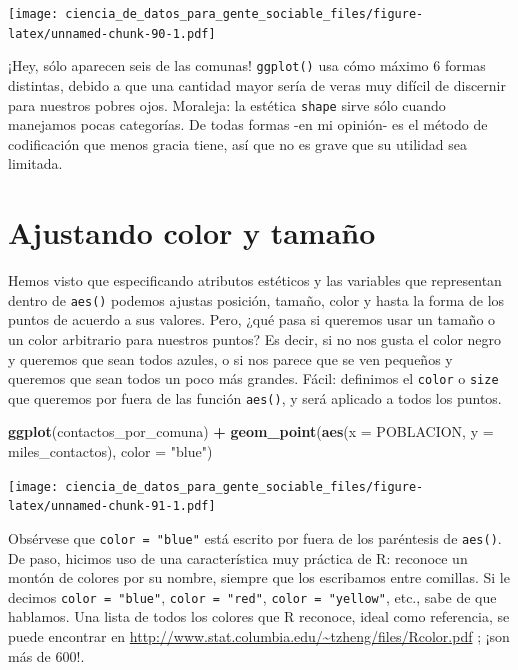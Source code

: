 \documentclass[spanish,]{book}
\newenvironment{Shaded}{\begin{snugshade}}{\end{snugshade}}
\newcommand{\DataTypeTok}[1]{\textcolor[rgb]{0.13,0.29,0.53}{#1}}
\newcommand{\KeywordTok}[1]{\textcolor[rgb]{0.13,0.29,0.53}{\textbf{#1}}}
\newcommand{\NormalTok}[1]{#1}
\newcommand{\OperatorTok}[1]{\textcolor[rgb]{0.81,0.36,0.00}{\textbf{#1}}}
\newcommand{\StringTok}[1]{\textcolor[rgb]{0.31,0.60,0.02}{#1}}
\begin{document}
\texttt{[image: ciencia\_de\_datos\_para\_gente\_sociable\_files/figure-latex/unnamed-chunk-90-1.pdf]}

¡Hey, sólo aparecen seis de las comunas! \texttt{ggplot()} usa cómo máximo 6 formas distintas, debido a que una cantidad mayor sería de veras muy difícil de discernir para nuestros pobres ojos. Moraleja: la estética \texttt{shape} sirve sólo cuando manejamos pocas categorías. De todas formas -en mi opinión- es el método de codificación que menos gracia tiene, así que no es grave que su utilidad sea limitada.

\hypertarget{ajustando-color-y-tamauxf1o}{%
\section{Ajustando color y tamaño}\label{ajustando-color-y-tamauxf1o}}

Hemos visto que especificando atributos estéticos y las variables que representan dentro
de \texttt{aes()} podemos ajustas posición, tamaño, color y hasta la forma de los puntos de acuerdo a sus valores. Pero, ¿qué pasa si queremos usar un tamaño o un color arbitrario para nuestros puntos? Es decir, si no nos gusta el color negro y queremos que sean todos azules, o si nos parece que se ven pequeños y queremos que sean todos un poco más grandes. Fácil: definimos el \texttt{color} o \texttt{size} que queremos por fuera de las función \texttt{aes()}, y será aplicado a todos los puntos.

\begin{Shaded}
\begin{Highlighting}[]
\KeywordTok{ggplot}\NormalTok{(contactos_por_comuna) }\OperatorTok{+}\StringTok{ }
\StringTok{    }\KeywordTok{geom_point}\NormalTok{(}\KeywordTok{aes}\NormalTok{(}\DataTypeTok{x =}\NormalTok{ POBLACION, }\DataTypeTok{y =}\NormalTok{ miles_contactos), }\DataTypeTok{color =} \StringTok{"blue"}\NormalTok{)}
\end{Highlighting}
\end{Shaded}

\texttt{[image: ciencia\_de\_datos\_para\_gente\_sociable\_files/figure-latex/unnamed-chunk-91-1.pdf]}

Obsérvese que \texttt{color\ =\ "blue"} está escrito por fuera de los paréntesis de \texttt{aes()}. De paso, hicimos uso de una característica muy práctica de R: reconoce un montón de colores por su nombre, siempre que los escribamos entre comillas. Si le decimos \texttt{color\ =\ "blue"}, \texttt{color\ =\ "red"}, \texttt{color\ =\ "yellow"}, etc., sabe de que hablamos. Una lista de todos los colores que R reconoce, ideal como referencia, se puede encontrar en \url{http://www.stat.columbia.edu/~tzheng/files/Rcolor.pdf} ; ¡son más de 600!.
\end{document}
